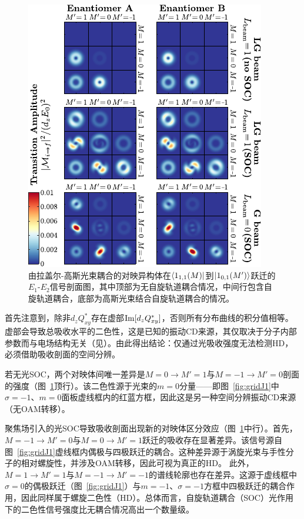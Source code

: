 \documentclass[reprint,aps,prl,twocolumn,superscriptaddress,groupedaddress]{revtex4-2}
\newcommand{\eoet}{$E_1$-$E_2$}
\begin{document}
\begin{CJK*}{UTF8}{gbsn}
\begin{figure}[t!]
    \centering
    \includegraphics[width=1.0\columnwidth]{Figure2.pdf}
    \caption{由拉盖尔-高斯光束耦合的对映异构体在$\bra{1_{1,1}(M)}$到$\ket{1_{0,1}(M')}$跃迁的\eoet 信号剖面图，其中顶部为无自旋轨道耦合情况，中间行包含自旋轨道耦合，底部为高斯光束结合自旋轨道耦合的情况。}
    \label{fig:profiles}
\end{figure}
首先注意到，除非$d_zQ_{xy}^*$存在虚部${\rm Im}[d_zQ_{xy}^*]$，否则所有分布曲线的积分值相等。虚部会导致总吸收水平的二色性，这是已知的振动CD来源，其仅取决于分子内部参数而与电场结构无关（见\cite{Buckingham1971}）。由此得出结论：仅通过光吸收强度无法检测HD，必须借助吸收剖面的空间分辨\cite{Loeffler2011}。

若无光SOC，两个对映体间唯一差异是$M=0\to M'=1$与$M=-1\to M'=0$剖面的强度（图~\ref{fig:profiles}顶行）。该二色性源于光束的$m=0$分量——即图~\ref{fig:gridJ1}中$\sigma=-1$、$m=0$面板虚线框内的红蓝方框，因此这是另一种空间分辨振动CD来源（无OAM转移）。

聚焦场引入的光SOC导致吸收剖面出现新的对映体区分效应（图~\ref{fig:profiles}中行）。首先，$M=-1\to M'=0$与$M=0\to M'=1$跃迁的吸收存在显著差异。该信号源自图~\ref{fig:gridJ1}虚线框内偶极与四极跃迁的耦合。这种差异源于涡旋光束与手性分子的相对螺旋性，并涉及OAM转移，因此可视为真正的HD。
此外，$M=1\to M'=1$与$M=-1\to M'=-1$的谱线轮廓也存在差异。这源于虚线框中$\sigma=0$的偶极跃迁（图~\ref{fig:gridJ1}）与$m=-1$、$\sigma=-1$方框中四极跃迁的耦合作用，因此同样属于螺旋二色性（HD）。总体而言，自旋轨道耦合（SOC）光作用下的二色性信号强度比无耦合情况高出一个数量级。


\end{CJK*}
\end{document}
